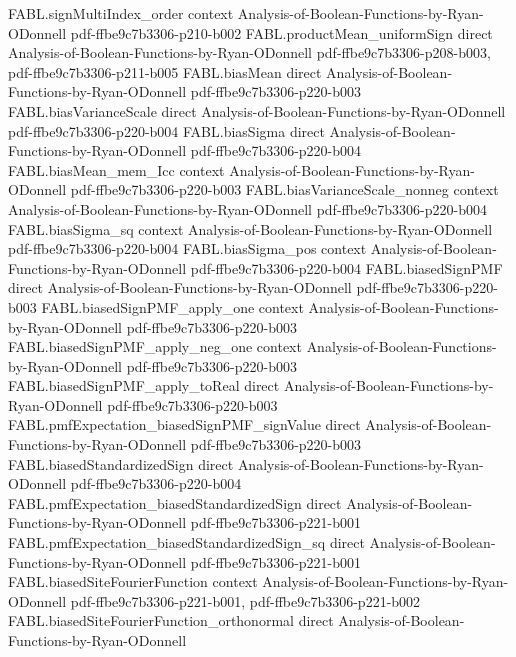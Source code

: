 \begin{theorem}
  {FABL.signMultiIndex_order}
  {context}
  {Analysis-of-Boolean-Functions-by-Ryan-ODonnell}
  {pdf-ffbe9c7b3306-p210-b002}
\proofstep
  {FABL.productMean_uniformSign}
  {direct}
  {Analysis-of-Boolean-Functions-by-Ryan-ODonnell}
  {pdf-ffbe9c7b3306-p208-b003,
    pdf-ffbe9c7b3306-p211-b005}
\proofstep
  {FABL.biasMean}
  {direct}
  {Analysis-of-Boolean-Functions-by-Ryan-ODonnell}
  {pdf-ffbe9c7b3306-p220-b003}
\proofstep
  {FABL.biasVarianceScale}
  {direct}
  {Analysis-of-Boolean-Functions-by-Ryan-ODonnell}
  {pdf-ffbe9c7b3306-p220-b004}
\proofstep
  {FABL.biasSigma}
  {direct}
  {Analysis-of-Boolean-Functions-by-Ryan-ODonnell}
  {pdf-ffbe9c7b3306-p220-b004}
\proofstep
  {FABL.biasMean_mem_Icc}
  {context}
  {Analysis-of-Boolean-Functions-by-Ryan-ODonnell}
  {pdf-ffbe9c7b3306-p220-b003}
\proofstep
  {FABL.biasVarianceScale_nonneg}
  {context}
  {Analysis-of-Boolean-Functions-by-Ryan-ODonnell}
  {pdf-ffbe9c7b3306-p220-b004}
\proofstep
  {FABL.biasSigma_sq}
  {context}
  {Analysis-of-Boolean-Functions-by-Ryan-ODonnell}
  {pdf-ffbe9c7b3306-p220-b004}
\proofstep
  {FABL.biasSigma_pos}
  {context}
  {Analysis-of-Boolean-Functions-by-Ryan-ODonnell}
  {pdf-ffbe9c7b3306-p220-b004}
\proofstep
  {FABL.biasedSignPMF}
  {direct}
  {Analysis-of-Boolean-Functions-by-Ryan-ODonnell}
  {pdf-ffbe9c7b3306-p220-b003}
\proofstep
  {FABL.biasedSignPMF_apply_one}
  {context}
  {Analysis-of-Boolean-Functions-by-Ryan-ODonnell}
  {pdf-ffbe9c7b3306-p220-b003}
\proofstep
  {FABL.biasedSignPMF_apply_neg_one}
  {context}
  {Analysis-of-Boolean-Functions-by-Ryan-ODonnell}
  {pdf-ffbe9c7b3306-p220-b003}
\proofstep
  {FABL.biasedSignPMF_apply_toReal}
  {direct}
  {Analysis-of-Boolean-Functions-by-Ryan-ODonnell}
  {pdf-ffbe9c7b3306-p220-b003}
\proofstep
  {FABL.pmfExpectation_biasedSignPMF_signValue}
  {direct}
  {Analysis-of-Boolean-Functions-by-Ryan-ODonnell}
  {pdf-ffbe9c7b3306-p220-b003}
\proofstep
  {FABL.biasedStandardizedSign}
  {direct}
  {Analysis-of-Boolean-Functions-by-Ryan-ODonnell}
  {pdf-ffbe9c7b3306-p220-b004}
\proofstep
  {FABL.pmfExpectation_biasedStandardizedSign}
  {direct}
  {Analysis-of-Boolean-Functions-by-Ryan-ODonnell}
  {pdf-ffbe9c7b3306-p221-b001}
\proofstep
  {FABL.pmfExpectation_biasedStandardizedSign_sq}
  {direct}
  {Analysis-of-Boolean-Functions-by-Ryan-ODonnell}
  {pdf-ffbe9c7b3306-p221-b001}
\proofstep
  {FABL.biasedSiteFourierFunction}
  {context}
  {Analysis-of-Boolean-Functions-by-Ryan-ODonnell}
  {pdf-ffbe9c7b3306-p221-b001,
    pdf-ffbe9c7b3306-p221-b002}
\proofstep
  {FABL.biasedSiteFourierFunction_orthonormal}
  {direct}
  {Analysis-of-Boolean-Functions-by-Ryan-ODonnell}

\end{theorem}
